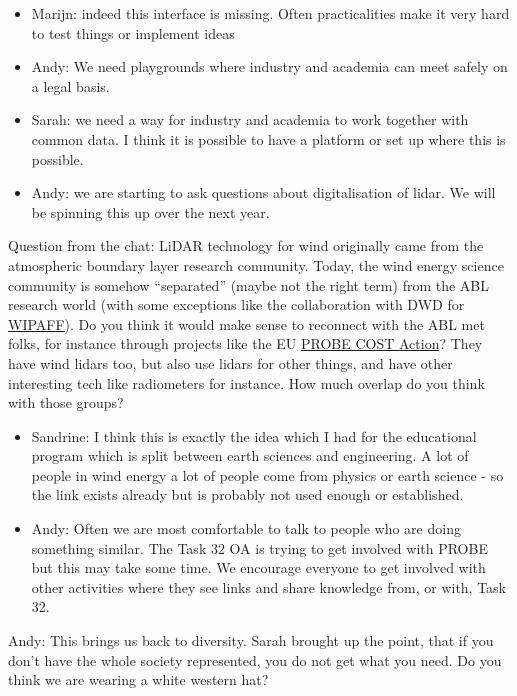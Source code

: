 \begin{itemize}
	\item Marijn: indeed this interface is missing. Often practicalities make it very hard to test things or implement ideas
	\item Andy: We need playgrounds where industry and academia can meet safely on a legal basis.
	\item Sarah: we need a way for industry and academia to work together with common data. I think it is possible to have a platform or set up where this is possible.
	\item Andy: we are starting to ask questions about digitalisation of lidar. We will be spinning this up over the next year.
\end{itemize}

Question from the chat: LiDAR technology for wind originally came from the atmospheric boundary layer research community. Today, the wind energy science community is somehow \enquote{separated} (maybe not the right term) from the ABL research world (with some exceptions like the collaboration with DWD for \href{https://www.windfors.de/en/projects/wipaff/}{WIPAFF}). Do you think it would make sense to reconnect with the ABL met folks, for instance through projects like the EU \href{https://www.cost.eu/actions/CA18235/\#tabs\%7CName:overview}{PROBE COST Action}? They have wind lidars too, but also use lidars for other things, and have other interesting tech like radiometers for instance. How much overlap do you think with those groups?

\begin{itemize}
	\item Sandrine: I think this is exactly the idea which I had for the educational program which is split between earth sciences and engineering. A lot of people in wind energy a lot of people come from physics or earth science - so the link exists already but is probably not used enough or established.
	\item Andy: Often we are most comfortable to talk to people who are doing something similar. The Task 32 OA is trying to get involved with PROBE but this may take some time. We encourage everyone to get involved with other activities where they see links and share knowledge from, or with, Task 32.
\end{itemize}

Andy: This brings us back to diversity. Sarah brought up the point, that if you don't have the whole society represented, you do not get what you need. Do you think we are wearing a white western hat?

